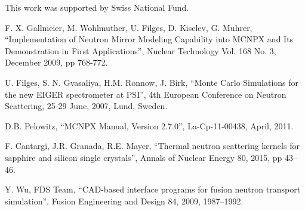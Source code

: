 \documentclass[a4paper,
              ]{jacow}
\begin{document}
This work was supported by Swiss National Fund.

\begin{thebibliography}{9}   %

  F. X. Gallmeier, M. Wohlmuther, U. Filges, D. Kiselev, G. Muhrer,
  ``Implementation of Neutron Mirror Modeling Capability into MCNPX and Its Demonstration in First Applications'',
  Nuclear Technology Vol. 168 No. 3, December 2009, pp 768-772. 

  U. Filges, S. N. Gvasaliya, H.M. Ronnow, J. Birk,
  ``Monte Carlo Simulations for the new EIGER spectrometer at PSI'',
  4th European Conference on Neutron Scattering, 25-29 June, 2007, Lund, Sweden. 

   D.B. Pelowitz,
   ``MCNPX Manual, Version 2.7.0'',
   La-Cp-11-00438, April, 2011.

  F. Cantargi, J.R. Granada, R.E. Mayer, 
  ``Thermal neutron scattering kernels for sapphire and silicon single crystals'', 
  Annals of Nuclear Energy 80, 2015, pp 43–46.  

  Y. Wu, FDS Team, 
  ``CAD-based interface programs for fusion neutron transport simulation'', 
  Fusion Engineering and Design 84, 2009, 1987–1992.

\end{thebibliography}
\end{document}

